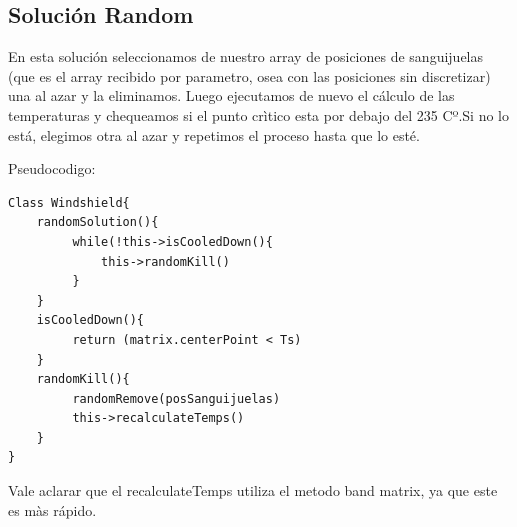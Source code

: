 \subsection{Solución Random}\label{sec:solucionRandom}


En esta solución seleccionamos de nuestro array de posiciones de sanguijuelas (que es el array recibido por parametro, osea con las posiciones sin discretizar) una al azar y la eliminamos. Luego ejecutamos de nuevo el cálculo de las temperaturas y chequeamos si el punto crìtico esta por debajo del 235 Cº.Si no lo está, elegimos otra al azar y repetimos el proceso hasta que lo esté. 

Pseudocodigo:

\begin{verbatim}
Class Windshield{
    randomSolution(){
         while(!this->isCooledDown(){
             this->randomKill()
         }
    } 
    isCooledDown(){
         return (matrix.centerPoint < Ts)
    }
    randomKill(){
         randomRemove(posSanguijuelas)
         this->recalculateTemps()
    }
}
\end{verbatim}

Vale aclarar que el recalculateTemps utiliza el metodo band matrix, ya que este es màs rápido.









